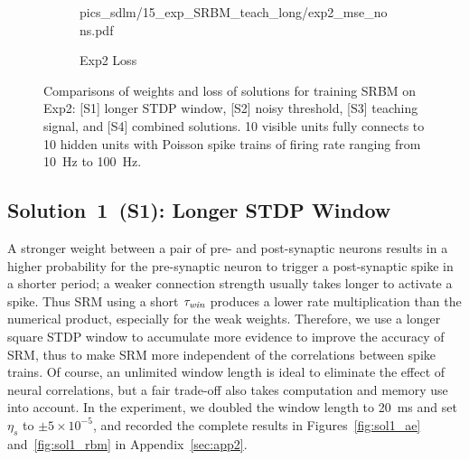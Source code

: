 \begin{figure}
\begin{subfigure}[c]{0.48\textwidth}
{			{pics_sdlm/15_exp_SRBM_teach_long/exp2_mse_nons.pdf}}\\
		\caption{Exp2 Loss}
	\end{subfigure}%
	\caption[Comparisons of solutions in training SRBM.]{Comparisons of weights and loss of solutions for training SRBM on Exp2: [S1] longer STDP window, [S2] noisy threshold, [S3] teaching signal, and [S4] combined solutions. 10 visible units fully connects to 10 hidden units with Poisson spike trains of firing rate ranging from 10~Hz to 100~Hz.}
	\label{fig:sols_rbm}
\end{figure}

\subsection{Solution~1~(S1): Longer STDP Window}
A stronger weight between a pair of pre- and post-synaptic neurons results in a higher probability for the pre-synaptic neuron to trigger a post-synaptic spike in a shorter period; 
a weaker connection strength usually takes longer to activate a spike.
Thus SRM using a short $\tau_{\textit{\textrm{win}}}$ produces a lower rate multiplication than the numerical product, especially for the weak weights.
Therefore, we use a longer square STDP window to accumulate more evidence to improve the accuracy of SRM, thus to make SRM more independent of the correlations between spike trains.
Of course, an unlimited window length is ideal to eliminate the effect of neural correlations, but a fair trade-off also takes computation and memory use into account.
In the experiment, we doubled the window length to 20~ms and set $\eta_s$ to $\pm 5 \times 10^{-5}$, and recorded the complete results in Figures~\ref{fig:sol1_ae} and~\ref{fig:sol1_rbm} in Appendix~\ref{sec:app2}.

